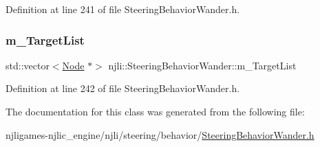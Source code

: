 Definition at line 241 of file Steering\+Behavior\+Wander.\+h.

\mbox{\label{classnjli_1_1_steering_behavior_wander_a23de8191e1cbf049343510609f059702}} 
\subsubsection{\texorpdfstring{m\+\_\+\+Target\+List}{m\_TargetList}}
{\footnotesize\ttfamily std\+::vector$<$\mbox{\hyperlink{classnjli_1_1_node}{Node}} $\ast$$>$ njli\+::\+Steering\+Behavior\+Wander\+::m\+\_\+\+Target\+List\hspace{0.3cm}{\ttfamily [private]}}



Definition at line 242 of file Steering\+Behavior\+Wander.\+h.



The documentation for this class was generated from the following file\+:\begin{DoxyCompactItemize}
\item 
njligames-\/njlic\+\_\+engine/njli/steering/behavior/\mbox{\hyperlink{_steering_behavior_wander_8h}{Steering\+Behavior\+Wander.\+h}}\end{DoxyCompactItemize}
